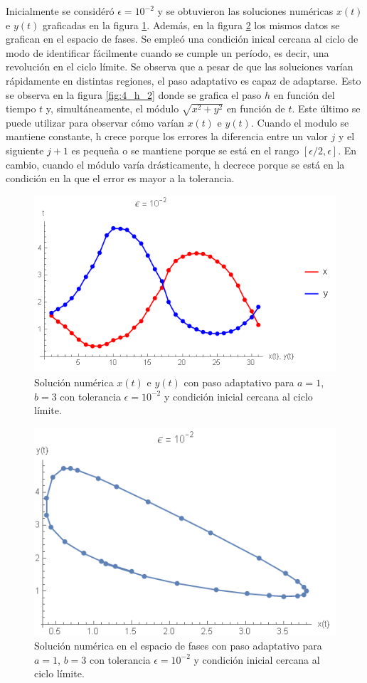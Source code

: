 \documentclass[aps,prb,twocolumn,superscriptaddress,floatfix,longbibliography]{revtex4-2}
\newcounter{para}
\begin{document}
Inicialmente se considéró $\epsilon = 10^{-2}$ y se obtuvieron las soluciones numéricas $x(t)$ e $y(t)$ graficadas en la figura \ref{fig:4_xy_2}. Además, en la figura \ref{fig:4_fases_2} los mismos datos se grafican en el espacio de fases. Se empleó una condición inical cercana al ciclo de modo de identificar fácilmente cuando se cumple un período, es decir, una revolución en el ciclo límite. Se observa que a pesar de que las soluciones varían rápidamente en distintas regiones, el paso adaptativo es capaz de adaptarse. Esto se observa en la figura \ref{fig:4_h_2} donde se grafica el paso $h$ en función del tiempo $t$ y, simultáneamente, el módulo $\sqrt{x^2 + y^2}$ en función de $t$. Este último se puede utilizar para observar cómo varían $x(t)$ e $y(t)$. Cuando el modulo se mantiene constante, h crece porque los errores la diferencia entre un valor $j$ y el siguiente $j+1$ es pequeña o se mantiene porque se está en el rango $[\epsilon / 2, \epsilon]$. En cambio, cuando el módulo varía drásticamente, h decrece porque se está en la condición en la que el error es mayor a la tolerancia.

\begin{figure}[]
    \includegraphics[clip=true,width=0.8\columnwidth]{4_xy_2.png}
    \caption{Solución numérica $x(t)$ e $y(t)$ con paso adaptativo para $a = 1$, $b = 3$ con tolerancia $\epsilon = 10^{-2}$ y condición inicial cercana al ciclo límite.}
     \label{fig:4_xy_2}
\end{figure}

\begin{figure}[]
    \includegraphics[clip=true,width=0.8\columnwidth]{4_fases_2.png}
    \caption{Solución numérica en el espacio de fases con paso adaptativo para $a = 1$, $b = 3$ con tolerancia $\epsilon = 10^{-2}$ y condición inicial cercana al ciclo límite.}
     \label{fig:4_fases_2}
\end{figure}
\end{document}
